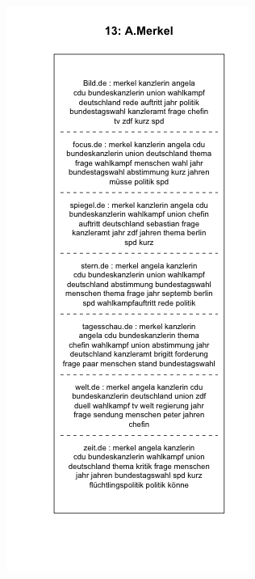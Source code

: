 \documentclass[12pt,a4paper,notitlepage]{article}
\begin{document}
\begin{figure}[H]
	\begin{center}
		\begin{subfigure}[normla]{0.49\textwidth}
			\includegraphics[width=\textwidth]{../figs/plotquote13.png}

\end{subfigure}
\end{center}
\end{figure}
\end{document}
